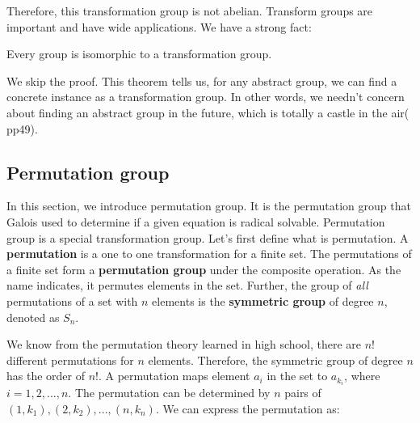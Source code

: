 \documentclass[b5paper]{article}
\begin{document}
Therefore, this transformation group is not abelian. Transform groups are important and have wide applications. We have a strong fact:

\begin{theorem}
Every group is isomorphic to a transformation group.
\end{theorem}

We skip the proof. This theorem tells us, for any abstract group, we can find a concrete instance as a transformation group. In other words, we needn't concern about finding an abstract group in the future, which is totally a castle in the air(\cite{ZhangHeRui1978} pp49).

\begin{Exercise}
\end{Exercise}

\subsection{Permutation group}
\label{permutation group}
\label{symmetric group}

In this section, we introduce permutation group. It is the permutation group that Galois used to determine if a given equation is radical solvable. Permutation group is a special transformation group. Let's first define what is permutation. A \textbf{permutation} is a one to one transformation for a finite set. The permutations of a finite set form a \textbf{permutation group} under the composite operation. As the name indicates, it permutes elements in the set. Further, the group of {\em all} permutations of a set with $n$ elements is the \textbf{symmetric group} of degree $n$, denoted as $S_n$.

We know from the permutation theory learned in high school, there are $n!$ different permutations for $n$ elements. Therefore, the symmetric group of degree $n$ has the order of $n!$. A permutation maps element $a_i$ in the set to $a_{k_i}$, where $i = 1, 2, ..., n$. The permutation can be determined by $n$ pairs of $(1, k_1), (2, k_2), ..., (n, k_n)$. We can express the permutation as:
\end{document}
